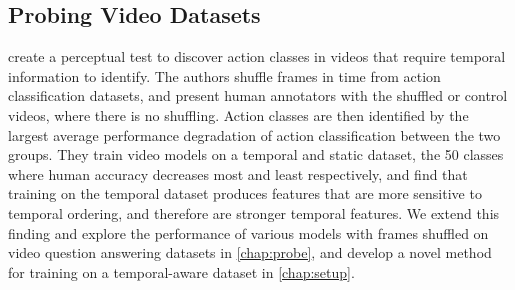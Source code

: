 

\subsection{Probing Video Datasets}
\label{ssec:tempprobes}
\citet{sevilla-lara2021temporal} create a perceptual test to discover action
classes in videos that require temporal information to identify. The authors
shuffle frames in time from action classification datasets, and present human
annotators with the shuffled or control videos, where there is no shuffling.
Action classes are then identified by the largest average performance
degradation of action classification between the two groups. They train video
models on a temporal and static dataset, the 50 classes where human accuracy
decreases most and least respectively, and find that training on the temporal
dataset produces features that are more sensitive to temporal ordering, and
therefore are stronger temporal features.
We extend this finding and explore the performance of various models with
frames shuffled on video question answering datasets in \cref{chap:probe}, and
develop a novel method for training  on a temporal-aware
dataset in \cref{chap:setup}.

%
%
%
%
